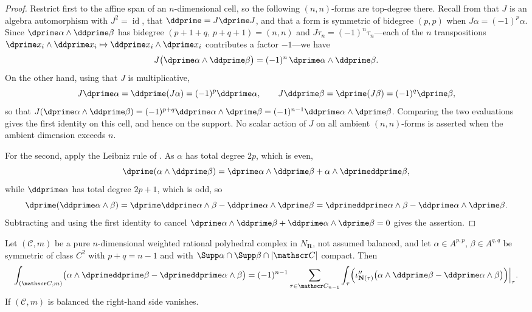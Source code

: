 \begin{proof}
Restrict first to the affine span of an $n$-dimensional cell, so the
following $(n,n)$-forms are top-degree there.  Recall from
 that $J$ is an algebra automorphism with
$J^2=\operatorname{id}$, that $\ddprime=J\dprime J$, and that a form is
symmetric of bidegree $(p,p)$ when $J\alpha=(-1)^p\alpha$.  Since
$\dprime\alpha\wedge\ddprime\beta$ has bidegree
$(p+1+q,\,p+q+1)=(n,n)$ and $J\tau_n=(-1)^n\tau_n$---each of the $n$
transpositions $\dprime x_i\wedge\ddprime x_i\mapsto
\ddprime x_i\wedge\dprime x_i$ contributes a factor $-1$---we have
\[
 J\bigl(\dprime\alpha\wedge\ddprime\beta\bigr)
 =(-1)^n\,\dprime\alpha\wedge\ddprime\beta .
\]
On the other hand, using that $J$ is multiplicative,
\[
 J\dprime\alpha=\ddprime(J\alpha)=(-1)^p\ddprime\alpha,
 \qquad
 J\ddprime\beta=\dprime(J\beta)=(-1)^q\dprime\beta,
\]
so that
$J(\dprime\alpha\wedge\ddprime\beta)
=(-1)^{p+q}\ddprime\alpha\wedge\dprime\beta
=(-1)^{n-1}\ddprime\alpha\wedge\dprime\beta$.  Comparing the two
evaluations gives the first identity on this cell, and hence on the
support.  No scalar action of $J$ on all ambient $(n,n)$-forms is asserted
when the ambient dimension exceeds $n$.

For the second, apply the Leibniz rule of
.  As $\alpha$ has total degree
$2p$, which is even,
\[
 \dprime(\alpha\wedge\ddprime\beta)
 =\dprime\alpha\wedge\ddprime\beta+\alpha\wedge\dprimeddprime\beta ,
\]
while $\ddprime\alpha$ has total degree $2p+1$, which is odd, so
\[
 \dprime(\ddprime\alpha\wedge\beta)
 =\dprime\ddprime\alpha\wedge\beta-\ddprime\alpha\wedge\dprime\beta
 =\dprimeddprime\alpha\wedge\beta-\ddprime\alpha\wedge\dprime\beta .
\]
Subtracting and using the first identity to cancel
$\dprime\alpha\wedge\ddprime\beta+\ddprime\alpha\wedge\dprime\beta=0$ gives
the assertion.
\end{proof}

\begin{theorem}
\label{thm:ch11-green-defect}
Let $(\mathscr C,m)$ be a pure $n$-dimensional weighted rational polyhedral
complex in $N_{\mathbf R}$, not assumed balanced, and let
$\alpha\in A^{p,p}$, $\beta\in A^{q,q}$ be symmetric of class $C^2$ with
$p+q=n-1$ and with
$\Supp\alpha\cap\Supp\beta\cap|\mathscr C|$ compact.  Then
\begin{equation}
\label{eq:ch11-green-defect}
 \int_{(\mathscr C,m)}
   \bigl(\alpha\wedge\dprimeddprime\beta-\dprimeddprime\alpha\wedge\beta\bigr)
 =(-1)^{n-1}\sum_{\tau\in\mathscr C_{n-1}}\int_\tau
   \Bigl(\iota''_{\mathbf N(\tau)}
     \bigl(\alpha\wedge\ddprime\beta-\ddprime\alpha\wedge\beta\bigr)
   \Bigr)\Big|_\tau .
\end{equation}
If $(\mathscr C,m)$ is balanced the right-hand side vanishes.
\end{theorem}


